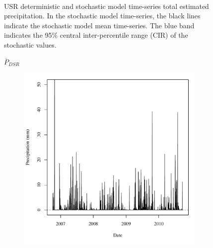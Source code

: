 \begin{linenumbers}
\begin{landscape}
\begin{figure}
\begin{subfigure}{0.7\textwidth}
		\end{subfigure}\\
		\caption[USR deterministic and stochastic model time-series total estimated precipitation.]{USR deterministic and stochastic model time-series total estimated precipitation.  In the stochastic model time-series, the black lines indicate the stochastic model mean time-series.  The blue band indicates the 95\% central inter-percentile range (CIR) of the stochastic values.}
		\label{fig:reachPrecip_US}
	\end{figure}
\end{landscape}
\subfiguretop
\begin{landscape}
	\begin{figure}
		\centering
		$ \displaystyle \overline{P}_{DSR} $
		\begin{subfigure}{0.7\textwidth}
			\centering
			\includegraphics[width=\tableCustomSize]{"Figures/Results_DSR/Deterministic/A Precip"}
		\end{subfigure}%
		\begin{subfigure}{0.7\textwidth}
			\centering

\end{subfigure}
\end{figure}
\end{landscape}
\end{linenumbers}
